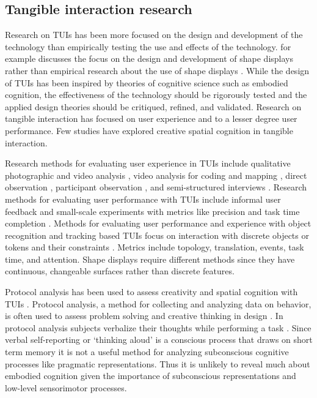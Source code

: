 \documentclass{article}
\begin{document}

\subsection{Tangible interaction research}

Research on TUIs has been more focused on the 
design and development of the technology 
than empirically testing the use and effects of the technology.
\citeauthor{Rasmussen2012} for example discusses 
the focus on the design and development of shape displays 
rather than empirical research about the use of shape displays 
\citeyearpar{Rasmussen2012}.
While the design of TUIs has been inspired by 
theories of cognitive science such as embodied cognition, 
the effectiveness of the technology should be rigorously tested
and the applied design theories should be critiqued, refined, and validated.
Research on tangible interaction has focused on user experience 
and to a lesser degree user performance.
Few studies have explored creative spatial cognition in tangible interaction.

Research methods for evaluating user experience in TUIs include 
qualitative photographic and video analysis \citep{Ishii2002,Horn2007},
video analysis for coding and mapping \citep{Bakker2011},
direct observation \citep{Horn2007},
participant observation \citep{Fielding-piper2002}, and
semi-structured interviews \citep{Fielding-piper2002,Horn2007}. 
Research methods for evaluating user performance with TUIs include 
informal user feedback \citep{Underkoffler1999,Leithinger2010}
and small-scale experiments with metrics like 
precision \citep{Iwata2001} and 
task time completion \citep{Leithinger2013}.
%
Methods for evaluating user performance and experience with
object recognition and tracking based TUIs 
focus on interaction with discrete objects or tokens
and their constraints \citep{Esteves2012}. 
Metrics include topology, translation, events, task time, and attention.
%
Shape displays require different methods
since they have continuous, changeable surfaces rather than discrete features.
 
Protocol analysis has been used to assess creativity and spatial cognition 
with TUIs \citep{Kim2008}. 
Protocol analysis, a method for collecting and analyzing data on behavior, 
is often used to assess problem solving and creative thinking
in design \citep{Dorst2001}. 
In protocol analysis subjects verbalize their thoughts while performing a task \citep{Ericsson1980,Ericsson1993}. 
Since verbal self-reporting or `thinking aloud' is a conscious process 
that draws on short term memory
it is not a useful method for analyzing subconscious cognitive processes 
like pragmatic representations. 
Thus it is unlikely to reveal much about embodied cognition 
given the importance of subconscious representations and 
low-level sensorimotor processes. 
\end{document}
